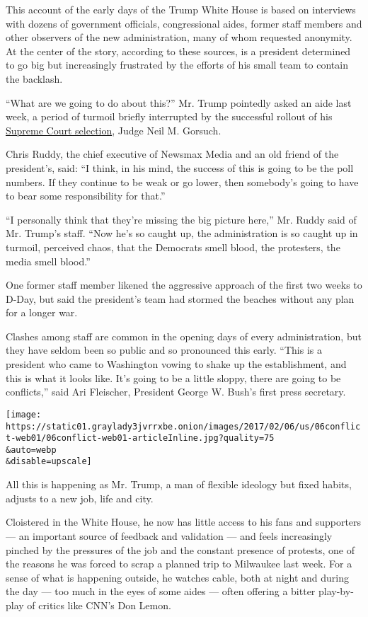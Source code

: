 This account of the early days of the Trump White House is based on
interviews with dozens of government officials, congressional aides,
former staff members and other observers of the new administration, many
of whom requested anonymity. At the center of the story, according to
these sources, is a president determined to go big but increasingly
frustrated by the efforts of his small team to contain the backlash.

``What are we going to do about this?'' Mr. Trump pointedly asked an
aide last week, a period of turmoil briefly interrupted by the
successful rollout of his
\href{https://www.nytimes3xbfgragh.onion/2017/01/31/us/politics/supreme-court-nominee-trump.html}{Supreme
Court selection}, Judge Neil M. Gorsuch.

Chris Ruddy, the chief executive of Newsmax Media and an old friend of
the president's, said: ``I think, in his mind, the success of this is
going to be the poll numbers. If they continue to be weak or go lower,
then somebody's going to have to bear some responsibility for that.''

``I personally think that they're missing the big picture here,'' Mr.
Ruddy said of Mr. Trump's staff. ``Now he's so caught up, the
administration is so caught up in turmoil, perceived chaos, that the
Democrats smell blood, the protesters, the media smell blood.''

One former staff member likened the aggressive approach of the first two
weeks to D-Day, but said the president's team had stormed the beaches
without any plan for a longer war.

Clashes among staff are common in the opening days of every
administration, but they have seldom been so public and so pronounced
this early. ``This is a president who came to Washington vowing to shake
up the establishment, and this is what it looks like. It's going to be a
little sloppy, there are going to be conflicts,'' said Ari Fleischer,
President George W. Bush's first press secretary.

\texttt{[image: https://static01.graylady3jvrrxbe.onion/images/2017/02/06/us/06conflict-web01/06conflict-web01-articleInline.jpg?quality=75\\\&auto=webp\\\&disable=upscale]}

All this is happening as Mr. Trump, a man of flexible ideology but fixed
habits, adjusts to a new job, life and city.

Cloistered in the White House, he now has little access to his fans and
supporters --- an important source of feedback and validation --- and
feels increasingly pinched by the pressures of the job and the constant
presence of protests, one of the reasons he was forced to scrap a
planned trip to Milwaukee last week. For a sense of what is happening
outside, he watches cable, both at night and during the day --- too much
in the eyes of some aides --- often offering a bitter play-by-play of
critics like CNN's Don Lemon.

